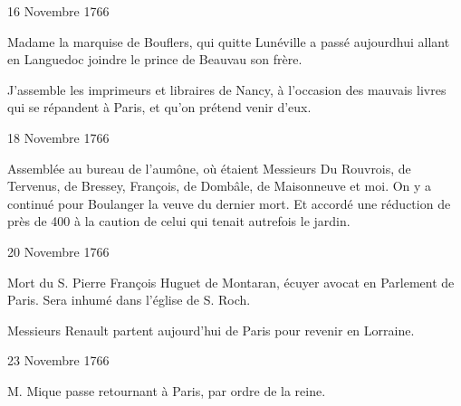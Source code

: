                      \begin{diary}{16 Novembre 1766}{}


                           Madame la marquise de Bouflers, qui quitte
                           Lunéville a passé
                           aujourdhui allant en
                           Languedoc joindre le prince de Beauvau son frère. \bigskip


                         J’assemble les imprimeurs et libraires
                           de
                           Nancy, à l’occasion des mauvais
                           livres
                           qui se répandent à Paris, et
                           qu’on prétend
                           venir d’eux. \bigskip


                     \end{diary}

                     \begin{diary}{18 Novembre 1766}{}


                         Assemblée au bureau de l’aumône, où étaient
                           Messieurs
                           Du Rouvrois, de Tervenus, de
                              Bressey,
                           François, de Dombâle, de Maisonneuve et moi.
                           On y a continué pour Boulanger la veuve du
                           dernier mort. Et accordé une réduction de
                           près de 400 à la caution de celui qui
                           tenait autrefois le jardin. \bigskip


                     \end{diary}

                     \begin{diary}{20 Novembre 1766}{}

                         Mort du S. Pierre François Huguet de
                              Montaran,
                           écuyer avocat en Parlement de
                              Paris. Sera inhumé
                           dans l’église de S. Roch. \bigskip



                           Messieurs Renault partent aujourd'hui de Paris
                           pour revenir en Lorraine.
                        \bigskip


                     \end{diary}

                     \begin{diary}{23 Novembre 1766}{}


                           M. Mique passe retournant à
                              Paris, par
                           ordre de la reine. \bigskip


                     \end{diary}



